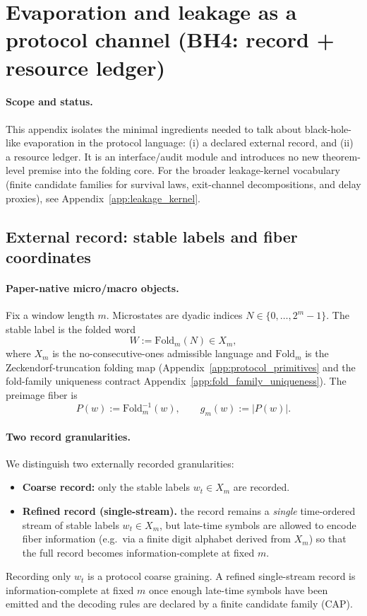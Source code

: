 \section{Evaporation and leakage as a protocol channel (BH4: record + resource ledger)}
\label{app:bh_evaporation_leak_channel}

\paragraph{Scope and status.}
\AuditTag This appendix isolates the minimal ingredients needed to talk about black-hole-like
evaporation in the protocol language: (i) a declared external record, and (ii) a resource ledger.
It is an interface/audit module and introduces no new theorem-level premise into the folding core.
For the broader leakage-kernel vocabulary (finite candidate families for survival laws, exit-channel
decompositions, and delay proxies), see Appendix~\ref{app:leakage_kernel}.

\subsection{External record: stable labels and fiber coordinates}
\label{subsec:bh4_external_record}

\paragraph{Paper-native micro/macro objects.}
Fix a window length $m$.
Microstates are dyadic indices $N\in\{0,\dots,2^m-1\}$.
The stable label is the folded word
\[
W:=\mathrm{Fold}_m(N)\in X_m,
\]
where $X_m$ is the no-consecutive-ones admissible language and $\mathrm{Fold}_m$ is the
Zeckendorf-truncation folding map (Appendix~\ref{app:protocol_primitives} and the fold-family uniqueness contract
Appendix~\ref{app:fold_family_uniqueness}).
The preimage fiber is
\[
P(w):=\mathrm{Fold}_m^{-1}(w),\qquad g_m(w):=|P(w)|.
\]

\paragraph{Two record granularities.}
\InterfaceTag We distinguish two externally recorded granularities:
\begin{itemize}
\item \textbf{Coarse record:} only the stable labels $w_t\in X_m$ are recorded.
\item \textbf{Refined record (single-stream).} the record remains a \emph{single} time-ordered stream of stable labels
$w_t\in X_m$, but late-time symbols are allowed to encode fiber information (e.g.\ via a finite digit alphabet derived
from $X_m$) so that the full record becomes information-complete at fixed $m$.
\end{itemize}
Recording only $w_t$ is a protocol coarse graining. A refined single-stream record is information-complete at fixed $m$
once enough late-time symbols have been emitted and the decoding rules are declared by a finite candidate family (CAP).

